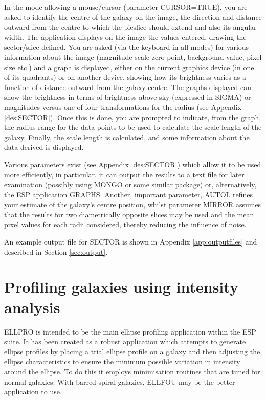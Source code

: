 \documentclass[twoside,11pt]{article}
\newcommand{\xlabel}[1]{}
\begin{document}
In the mode allowing a mouse/cursor (parameter CURSOR=TRUE), you are
asked to identify the centre of the galaxy on the image, the direction
and distance outward from the centre to which the pieslice should
extend and also its angular width. The application displays on the image
the values entered, drawing the sector/slice defined. You are asked
(via the keyboard in all modes) for various information about the image
(magnitude scale zero point, background value, pixel size etc.) and a graph
is displayed, either on the current graphics device (in one of its quadrants)
or on another device, showing how its brightness varies as a
function of distance outward from the galaxy centre. The graphs displayed
can show the brightness in terms of brightness above sky (expressed in SIGMA)
or magnitudes versus one of four transformations for the radius
(see Appendix \ref{des:SECTOR}). Once this is done, you are prompted to
indicate, from the graph,
the radius range for the data points to be used to calculate the scale
length of the galaxy. Finally, the scale length is calculated,
and some information about the data derived is displayed.

Various parameters exist (see Appendix \ref{des:SECTOR}) which allow it
to be used more
efficiently, in particular, it can output the results to a text
file for later examination (possibly using MONGO or some similar package) or,
alternatively, the ESP application GRAPHS. Another, important parameter, AUTOL
refines your estimate of the galaxy's centre position, whilst parameter
MIRROR assumes that the results for two diametrically opposite slices may
be used and the mean pixel values for each radii considered, thereby reducing
the influence of noise.

An example output file for SECTOR is shown in Appendix \ref{app:outputfiles}
and described in Section \ref{sec:output}.


\section{Profiling galaxies using intensity analysis}
\xlabel{ELLPRO}
\label{sec:profi}

ELLPRO is intended to be the main ellipse profiling application within the
ESP suite. It has been created as a robust application which attempts to
generate ellipse profiles by placing a trial ellipse profile on a
galaxy and then adjusting the ellipse characteristics to ensure the
minimum possible variation in intensity around the ellipse.
To do this it employs minimisation routines that are
tuned for normal galaxies. With barred spiral galaxies, ELLFOU may be the
better application to use.
\end{document}
